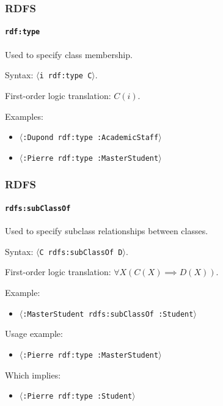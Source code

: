 \documentclass{beamer}
\newcommand{\triple}[1]{$\langle$\texttt{#1}$\rangle$}
\begin{document}
\begin{frame}
  \frametitle{RDFS}
  \framesubtitle{\texttt{rdf:type}}

  Used to specify class membership.

  \pause

  \bigskip

  Syntax: \triple{i rdf:type C}.

  \pause

  \medskip

  First-order logic translation: $C(i)$.

  \pause

  \bigskip

  Examples:

  \begin{itemize}
    \item \triple{:Dupond rdf:type :AcademicStaff}
    \item \triple{:Pierre rdf:type :MasterStudent}
  \end{itemize}
\end{frame}

\begin{frame}
  \frametitle{RDFS}
  \framesubtitle{\texttt{rdfs:subClassOf}}

  Used to specify subclass relationships between classes.

  \pause

  \bigskip

  Syntax: \triple{C rdfs:subClassOf D}.

  \pause

  \medskip

  First-order logic translation: $\forall X (C(X) \implies D(X))$.

  \pause

  \bigskip

  Example:

  \begin{itemize}
    \item \triple{:MasterStudent rdfs:subClassOf :Student}
  \end{itemize}

  \pause

  Usage example:

  \begin{itemize}
    \item \triple{:Pierre rdf:type :MasterStudent}
  \end{itemize}

  \pause

  Which implies:

  \begin{itemize}
    \item \triple{:Pierre rdf:type :Student}
  \end{itemize}
\end{frame}
\end{document}
